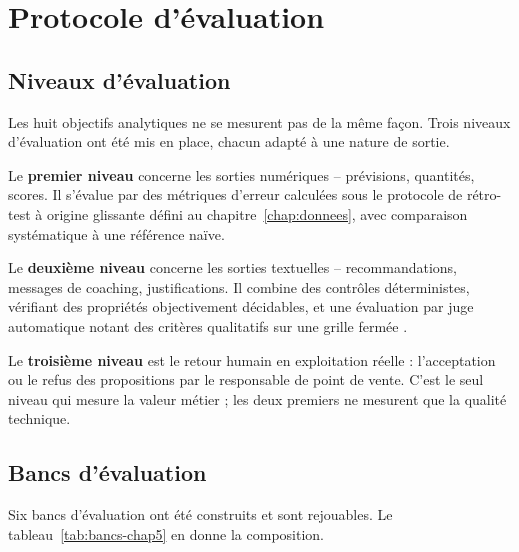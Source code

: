 \section{Protocole d'évaluation}
\label{sec:protocole}

\subsection{Niveaux d'évaluation}

Les huit objectifs analytiques ne se mesurent pas de la même façon. Trois niveaux d'évaluation ont été mis en place, chacun adapté à une nature de sortie.

Le \textbf{premier niveau} concerne les sorties numériques -- prévisions, quantités, scores. Il s'évalue par des métriques d'erreur calculées sous le protocole de rétro-test à origine glissante défini au chapitre~\ref{chap:donnees}, avec comparaison systématique à une référence naïve.

Le \textbf{deuxième niveau} concerne les sorties textuelles -- recommandations, messages de coaching, justifications. Il combine des contrôles déterministes, vérifiant des propriétés objectivement décidables, et une évaluation par juge automatique notant des critères qualitatifs sur une grille fermée \cite{zheng2023judge}.

Le \textbf{troisième niveau} est le retour humain en exploitation réelle : l'acceptation ou le refus des propositions par le responsable de point de vente. C'est le seul niveau qui mesure la valeur métier ; les deux premiers ne mesurent que la qualité technique.

\subsection{Bancs d'évaluation}

Six bancs d'évaluation ont été construits et sont rejouables. Le tableau~\ref{tab:bancs-chap5} en donne la composition.

\begingroup
\setlength{\tabcolsep}{3pt}
\renewcommand{\arraystretch}{1.15}
\small

